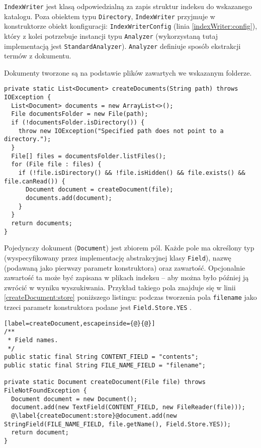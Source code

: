 \texttt{IndexWriter} jest klasą odpowiedzialną za zapis struktur indeksu do wskazanego katalogu. Poza obiektem typu \texttt{Directory}, \texttt{IndexWriter} przyjmuje w konstruktorze obiekt konfiguracji: \texttt{IndexWriterConfig} (linia \ref{indexWriter:config}), który z kolei potrzebuje instancji typu \texttt{Analyzer} (wykorzystaną tutaj implementacją jest \texttt{StandardAnalyzer}). \texttt{Analyzer} definiuje sposób ekstrakcji termów z dokumentu.

Dokumenty tworzone są na podstawie plików zawartych we wskazanym folderze.

\begin{lstlisting}
private static List<Document> createDocuments(String path) throws IOException {
  List<Document> documents = new ArrayList<>();
  File documentsFolder = new File(path);
  if (!documentsFolder.isDirectory()) {
    throw new IOException("Specified path does not point to a directory.");
  }
  File[] files = documentsFolder.listFiles();
  for (File file : files) {
    if (!file.isDirectory() && !file.isHidden() && file.exists() && file.canRead()) {
      Document document = createDocument(file);
      documents.add(document);
    }
  }
  return documents;
}
\end{lstlisting}

Pojedynczy dokument (\texttt{Document}) jest zbiorem pól. Każde pole ma określony typ (wyspecyfikowany przez implementację abstrakcyjnej klasy \texttt{Field}), nazwę (podawaną jako pierwszy parametr konstruktora) oraz zawartość. Opcjonalnie zawartość ta może być zapisana w plikach indeksu -- aby można było później ją zwrócić w wyniku wyszukiwania. Przykład takiego pola znajduje się w linii \ref{createDocument:store} poniższego listingu: podczas tworzenia pola \texttt{filename} jako trzeci parametr konstruktora podane jest \texttt{Field.Store.YES} .

\begin{lstlisting}[label=createDocument,escapeinside={@}{@}]
/**
 * Field names.
 */
public static final String CONTENT_FIELD = "contents";
public static final String FILE_NAME_FIELD = "filename";

private static Document createDocument(File file) throws FileNotFoundException {
  Document document = new Document();
  document.add(new TextField(CONTENT_FIELD, new FileReader(file)));
  @\label{createDocument:store}@document.add(new StringField(FILE_NAME_FIELD, file.getName(), Field.Store.YES));
  return document;
}
\end{lstlisting}

